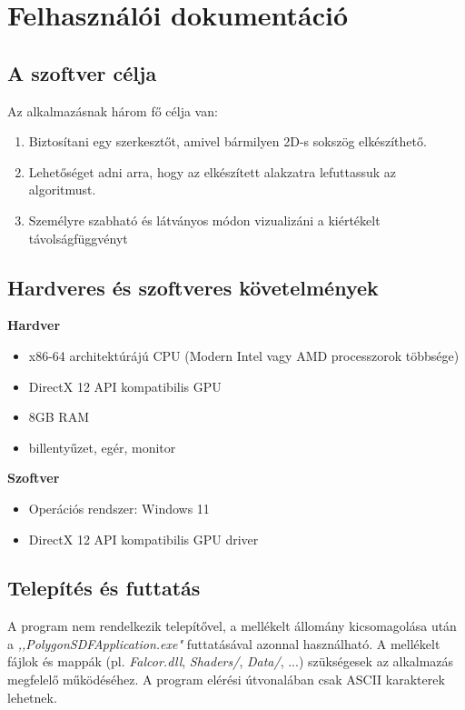 \chapter{Felhasználói dokumentáció}
\label{ch:user}


\section{A szoftver célja}

Az alkalmazásnak három fő célja van:
\begin{enumerate}
    \item Biztosítani egy szerkesztőt, amivel bármilyen 2D-s sokszög elkészíthető.
    \item Lehetőséget adni arra, hogy az elkészített alakzatra lefuttassuk az algoritmust.
    \item Személyre szabható és látványos módon vizualizáni a kiértékelt távolságfüggvényt
\end{enumerate}


\section{Hardveres és szoftveres követelmények}

\textbf{Hardver}
\begin{itemize}
    \item x86-64 architektúrájú CPU (Modern Intel vagy AMD processzorok többsége)
    \item DirectX 12 API kompatibilis GPU
    \item 8GB RAM
    \item billentyűzet, egér, monitor
\end{itemize}

\textbf{Szoftver}
\begin{itemize}
    \item Operációs rendszer: Windows 11
    \item DirectX 12 API kompatibilis GPU driver
\end{itemize}


\section{Telepítés és futtatás}

A program nem rendelkezik telepítővel, a mellékelt állomány kicsomagolása után a \textit{,,PolygonSDFApplication.exe"} futtatásával azonnal használható. A mellékelt fájlok és mappák (pl. \textit{Falcor.dll}, \textit{Shaders/}, \textit{Data/}, ...) szükségesek az alkalmazás megfelelő működéséhez. A program elérési útvonalában csak ASCII karakterek lehetnek.


